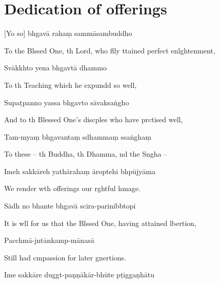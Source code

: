 \chapter{Dedication of offerings}

[Yo so] bhgavā rahaṃ sammāsambuddho

\begin{english}
To the Blssed One, th Lord, who flly ttained perfect enlghtenment,
\end{english}

Svākkhto yena bhgavtā dhammo

\begin{english}
To th Teaching which he expundd so well,
\end{english}

Supaṭpanno yassa bhgavto sāvaksaṅgho

\begin{english}
And to th Blessed One's discples who have prctised well,
\end{english}

Tam-myaṃ bhgavantaṃ sdhammaṃ ssaṅghaṃ

\begin{english}
To these -- th Buddha, th Dhamma, nd the Sngha --
\end{english}

Imeh sakkāreh yathārahaṃ āroptehi bhpūjyāma

\begin{english}
We render wth offerings our rghtful hmage.
\end{english}

Sādh no bhante bhgavā scira-parinibbtopi

\begin{english}
It is wll for us that the Blssed One, having attained lbertion,
\end{english}

Pacchmā-jntānkamp-mānasā

\begin{english}
Still had cmpassion for later gnertions.
\end{english}

Ime sakkāre duggt-paṇṇākār-bhūte pṭiggaṇhātu

